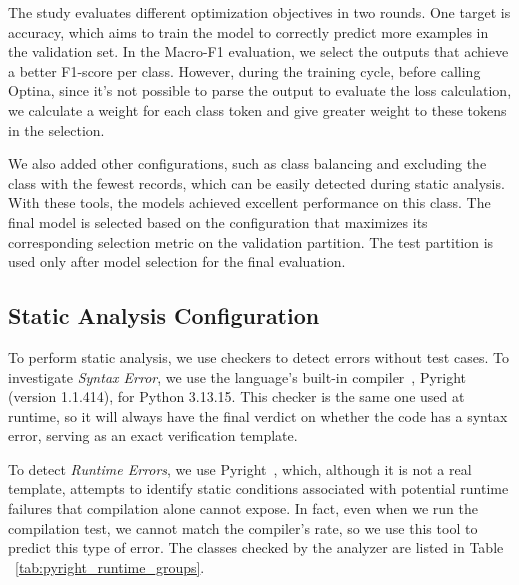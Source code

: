 The study evaluates different optimization objectives in two rounds. One target is accuracy, which aims to train the model to correctly predict more examples in the validation set. In the Macro-F1 evaluation, we select the outputs that achieve a better F1-score per class. However, during the training cycle, before calling Optina, since it's not possible to parse the output to evaluate the loss calculation, we calculate a weight for each class token and give greater weight to these tokens in the selection.

We also added other configurations, such as class balancing and excluding the class with the fewest records, which can be easily detected during static analysis. With these tools, the models achieved excellent performance on this class. The final model is selected based on the configuration that maximizes its corresponding selection metric on the validation partition. The test partition is used only after model selection for the final evaluation.

\subsection{Static Analysis Configuration}

To perform static analysis, we use checkers to detect errors without test cases. To investigate \emph{Syntax Error}, we use the language's built-in compiler~\citep{pythoncompile}, Pyright (version 1.1.414), for Python 3.13.15. This checker is the same one used at runtime, so it will always have the final verdict on whether the code has a syntax error, serving as an exact verification template.

To detect \emph{Runtime Errors}, we use Pyright~\citep{microsoftpyright}, which, although it is not a real template, attempts to identify static conditions associated with potential runtime failures that compilation alone cannot expose. In fact, even when we run the compilation test, we cannot match the compiler's rate, so we use this tool to predict this type of error. The classes checked by the analyzer are listed in Table ~\ref{tab:pyright_runtime_groups}.

